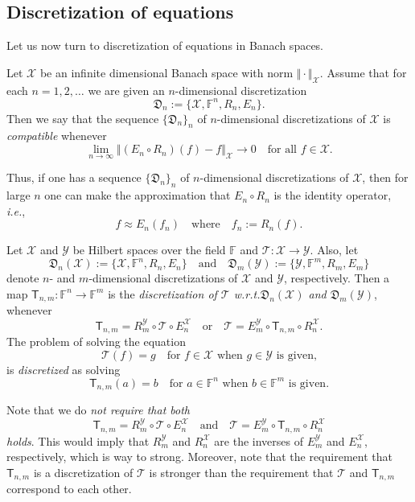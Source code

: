 \documentclass[a4paper]{paper}
\newcommand{\discr}{\mathfrak{D}}
\newcommand{\VecSpace}[1]{\mathscr{#1}}
\newcommand{\Field}{\mathbb{F}}
\newcommand{\Op}[1]{\mathcal{#1}}
\newcommand{\DiscOp}[1]{\mathsf{#1}}
\newcommand{\ie}{\textsl{i.e.}\xspace}
\begin{document}
\subsection{Discretization of equations}
Let us now turn to discretization of equations in Banach spaces.
\begin{definition} 
  Let $\VecSpace{X}$ be an infinite dimensional Banach space with norm $\Vert \cdot \Vert_{\VecSpace{X}}$. 
  Assume that for each $n=1,2,\ldots$ we are given an $n$-dimensional  discretization
  \[ \discr_{n} := \{ \VecSpace{X}, \Field^{n}, R_{n},E_{n} \}. \]
  Then we say that the  sequence $\{ \discr_{n} \}_{n}$ of $n$-dimensional discretizations 
  of $\VecSpace{X}$ is \emph{compatible} whenever
  \[ \lim_{n\to \infty} 
     \bigl\Vert ( E_{n}\circ R_{n})(f)-f \bigr\Vert_{\VecSpace{X}}\to 0
    \quad\text{for all $f\in \VecSpace{X}$.}\]
\end{definition}
Thus, if one has a sequence $\{ \discr_{n} \}_{n}$ of $n$-dimensional discretizations 
of $\VecSpace{X}$, then for large $n$ one can make the approximation that 
$E_{n}\circ  R_{n}$ is the identity operator, \ie,
\begin{equation}\label{eq:fApprox}
  f \approx E_{n}(f_{n}) \quad\text{where}\quad
  f_{n}:=R_{n}(f).
\end{equation}
\begin{definition}
  Let $\VecSpace{X}$ and $\VecSpace{Y}$ be Hilbert spaces over the field $\Field$ and $\Op{T} \colon \VecSpace{X} \to \VecSpace{Y}$. 
  Also, let 
  \[  \discr_{n}(\VecSpace{X}):=\bigl\{ \VecSpace{X},\Field^{n},R_{n},E_{n} \bigr\} 
     \quad\text{and}\quad
     \discr_{m}(\VecSpace{Y}):=\bigl\{ \VecSpace{Y},\Field^{m},R_{m},E_{m} \bigr\}\]
  denote $n$- and $m$-dimensional discretizations of $\VecSpace{X}$ and $\VecSpace{Y}$, 
  respectively. Then a map $\DiscOp{T}_{n,m} \colon \Field^{n} \to \Field^{m}$ is the
  \emph{discretization of $\Op{T}$ w.r.t.\@ $\discr_{n}(\VecSpace{X})$ and $\discr_{m}(\VecSpace{Y})$},  
  whenever 
  \[ \DiscOp{T}_{n,m} = R_{m}^{\VecSpace{Y}} \circ \Op{T} \circ E_{n}^{\VecSpace{X}} \quad\text{or}\quad
    \Op{T} = E_{m}^{\VecSpace{Y}} \circ \DiscOp{T}_{n,m} \circ R_{n}^{\VecSpace{X}}. \]
  The problem of  solving the equation
   \[  \Op{T}(f)=g \quad\text{for $f\in \VecSpace{X}$ when $g\in \VecSpace{Y}$ is given,} \]
  is \emph{discretized} as solving 
  \[   \DiscOp{T}_{n,m}(a)=b \quad\text{for $a\in \Field^{n}$ when $b\in \Field^{m}$ is given.} \]
\end{definition}  
\begin{remark}
Note that we do \emph{not require that both  
\[ \DiscOp{T}_{n,m} = R_{m}^{\VecSpace{Y}} \circ \Op{T} \circ E_{n}^{\VecSpace{X}} \quad\text{and}\quad
    \Op{T} = E_{m}^{\VecSpace{Y}} \circ \DiscOp{T}_{n,m} \circ R_{n}^{\VecSpace{X}} \]
holds}. This would imply that  $R_{m}^{\VecSpace{Y}}$ and $R_{n}^{\VecSpace{X}}$ are the inverses of $E_{m}^{\VecSpace{Y}}$ and 
$E_{n}^{\VecSpace{X}}$, respectively, which is way to strong. Moreover, note that the requirement that 
$\DiscOp{T}_{n,m}$ is a discretization of $\Op{T}$ is stronger than  the requirement that 
$\Op{T}$ and $\DiscOp{T}_{n,m}$ correspond to each other.
\end{remark}
\end{document}
